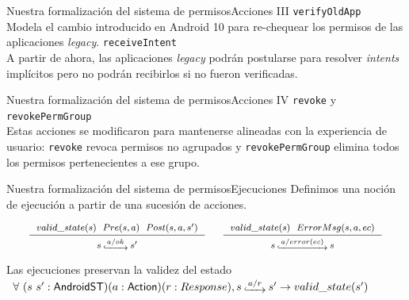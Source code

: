\documentclass[pdf, handout]{beamer} %
\begin{document}
\begin{frame}{Nuestra formalización del sistema de permisos}{Acciones III}
    \texttt{verifyOldApp}\\
    \vspace{5px}
    Modela el cambio introducido en Android 10 para re-chequear los permisos de las aplicaciones
    \textit{legacy}.
    \pause
    \vspace{10px}
    \texttt{receiveIntent}\\
    \vspace{5px}
    A partir de ahora, las aplicaciones \textit{legacy} podrán postularse para resolver
    \textit{intents} implícitos pero no podrán recibirlos si no fueron verificadas.
\end{frame}

\begin{frame}{Nuestra formalización del sistema de permisos}{Acciones IV}
    \texttt{revoke} y \texttt{revokePermGroup}\\
    \vspace{5px}
    Estas acciones se modificaron para mantenerse alineadas con la experiencia de usuario:
    \texttt{revoke} revoca permisos no agrupados y \texttt{revokePermGroup} elimina todos los
    permisos pertenecientes a ese grupo.\\
\end{frame}


\begin{frame}{Nuestra formalización del sistema de permisos}{Ejecuciones}
    Definimos una noción de ejecución a partir de una sucesión de acciones.

    \begin{displaymath}
        \fontsize{8pt}{9pt}\selectfont
        \begin{array}{c}
            \inference[]{$$valid\_state(s)$$ \hspace{.2cm} $$Pre(s, a)$$ \hspace{.2cm} $$Post(s, a, s')$$}{$$s\step{a/ok}s'$$}
            \hspace{0.5cm}
            \inference[]{$$valid\_state(s)$$ \hspace{.2cm} $$ErrorMsg(s, a, ec)$$}{$$s\step{a/error(ec)}s$$}
        \end{array}
    \end{displaymath}
    \pause
    \begin{theorem}{Las ejecuciones preservan la validez del estado}
        \fontsize{9pt}{12pt}\selectfont
        $\begin{array}{l} \forall\ (s\ s':\AndroidState)(a:\Action) (r:Response), s\step{a/r}s'
                \rightarrow valid\_state(s')\end{array}$
    \end{theorem}
\end{frame}
\end{document}
